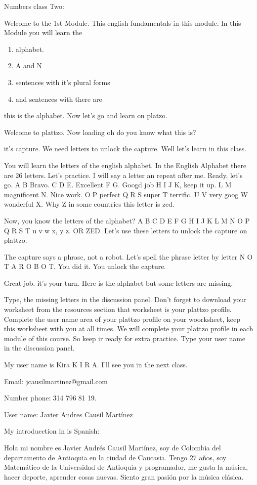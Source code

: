 Numbers class Two: 

Welcome to the 1st Module. This english fundamentals in this module.
In this Module you will learn the 
\begin{enumerate}
	\item alphabet.
	\item A and N 
	\item sentences with it's plural forms
	\item  and sentences with there are
\end{enumerate}
 this is the alphabet. Now let's go and learn on platzo.
 
 Welcome to plattzo. Now loading oh do you know what this is?
 
 it's capture. We need letters to unlock the capture. Well let's learn in this class. 
 
 You will learn the letters of the english alphabet. In the English Alphabet there are 26 letters. Let's practice. I will say a letter an repeat after me. Ready, let's go. A B Bravo. C D E. Excellent F G. Googd job H I J K, keep it up. L M magnificent N. Nice work. O P perfect Q R S super T terrific. U V very goog W wonderful X. Why Z in some countries this letter is zed.
 
 Now, you know the letters of the alphabet? A B C D E F G H I J K L M N O P Q R S T u v w x, y z. OR ZED. 	Let's use these letters to unlock the capture on plattzo.
 
 The capture says a phrase, not a robot. Let's spell the phrase letter by letter N O T A R O B O T. You did it. You unlock the capture. 
 
 Great job. it's your turn. Here is the alphabet but some letters are missing. 
 
 Type, the missing letters in the discussion panel. 
 Don't forget to download your worksheet from the resources section that worksheet is your plattzo profile. Complete the user name area of your plattzo profile on your woorksheet, keep this worksheet with you at all times. We will complete your plattzo profile in each module of this course. So keep ir ready for extra practice. Type your user name in the discussion panel.
 
 My user name is Kira K I R A. I'll see you in the next class.
 
 
 Email: jcausilmartinez@gmail.com
 
 Number phone: 314 796 81 19.
 
 User name: Javier Andres Causil Martínez


My introducction in is Spanish:  

Hola mi nombre es Javier Andr\'es Causil Mart\'inez, soy de Colombia del departamento de Antioquia en la ciudad de Caucasia. Tengo 27 a\~nos, soy Matem\'atico  de la Universidad de Antioquia y programador, me gusta la m\'usica, hacer deporte, aprender cosas nuevas. Siento gran pasi\'on por la m\'usica cl\'asica. 





